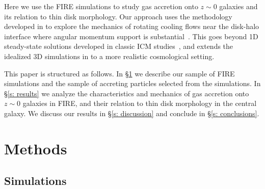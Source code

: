 \documentclass[fleqn,usenatbib]{mnras}
\begin{document}
Here we use the FIRE simulations to study gas accretion onto $z\sim0$ galaxies and its relation to thin disk morphology.
Our approach uses the methodology developed in \citet{Hafen2019, Hafen2020} to  explore the mechanics of rotating cooling flows near the disk-halo interface where angular momentum support is substantial~\citep[e.g.][]{Oppenheimer2018}.
This goes beyond 1D steady-state solutions developed in classic ICM studies~\citep[e.g.][]{Cowie1980}, and extends the idealized 3D simulations in \cite{Stern2019} to a more realistic cosmological setting. 

This paper is structured as follows. 
In \S\ref{s: methods} we describe our sample of FIRE simulations and the sample of accreting particles selected from the simulations.
In \S\ref{s: results} we analyze the characteristics and mechanics of gas accretion onto $z\sim0$ galaxies in FIRE, and their relation to thin disk morphology in the central galaxy.
We discuss our results in \S\ref{s: discussion} and conclude in \S\ref{s: conclusions}.

\section{Methods}
\label{s: methods}

\subsection{Simulations}
\label{s: methods -- simulations}
\end{document}
